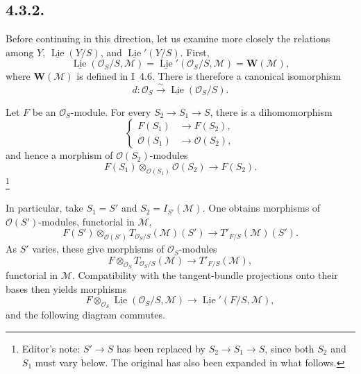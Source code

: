\subsection*{4.3.2.}
Before continuing in this direction, let us examine more closely the
relations among \(Y\), \(\underline{\operatorname{Lie}}(Y/S)\), and
\(\underline{\operatorname{Lie}}'(Y/S)\). First,
\begin{equation}
 \underline{\operatorname{Lie}}(\mathcal O_S/S,\mathcal M)
 =\underline{\operatorname{Lie}}'(\mathcal O_S/S,\mathcal M)
 =\mathbf W(\mathcal M),
 \tag{1}
\end{equation}
where \(\mathbf W(\mathcal M)\) is defined in I~4.6. There is therefore a
canonical isomorphism
\begin{equation}
 d:\mathcal O_S\xrightarrow{\sim}
 \underline{\operatorname{Lie}}(\mathcal O_S/S).
 \tag{2}
\end{equation}

Let \(F\) be an \(\mathcal O_S\)-module. For every
\(S_2\to S_1\to S\), there is a dihomomorphism
\begin{equation}
 \left\{
 \begin{aligned}
   F(S_1)&\longrightarrow F(S_2),\\
   \mathcal O(S_1)&\longrightarrow\mathcal O(S_2),
 \end{aligned}
 \right.
 \tag{3}
\end{equation}
and hence a morphism of \(\mathcal O(S_2)\)-modules
\[
 F(S_1)\otimes_{\mathcal O(S_1)}\mathcal O(S_2)
 \longrightarrow F(S_2).
\]
\footnote{Editor's note: \(S'\to S\) has been replaced by
\(S_2\to S_1\to S\), since both \(S_2\) and \(S_1\) must vary below.
The original has also been expanded in what follows.}

In particular, take \(S_1=S'\) and \(S_2=I_{S'}(\mathcal M)\). One
obtains morphisms of \(\mathcal O(S')\)-modules, functorial in
\(\mathcal M\),
\[
 F(S')\otimes_{\mathcal O(S')}
 T_{\mathcal O_S/S}(\mathcal M)(S')
 \longrightarrow T'_{F/S}(\mathcal M)(S').
\]
As \(S'\) varies, these give morphisms of \(\mathcal O_S\)-modules
\begin{equation}
 F\otimes_{\mathcal O_S}T_{\mathcal O_S/S}(\mathcal M)
 \longrightarrow T'_{F/S}(\mathcal M),
 \tag{4}
\end{equation}
functorial in \(\mathcal M\). Compatibility with the tangent-bundle
projections onto their bases then yields morphisms
\begin{equation}
 F\otimes_{\mathcal O_S}
 \underline{\operatorname{Lie}}(\mathcal O_S/S,\mathcal M)
 \longrightarrow
 \underline{\operatorname{Lie}}'(F/S,\mathcal M),
 \tag{5}
\end{equation}
and the following diagram commutes.

